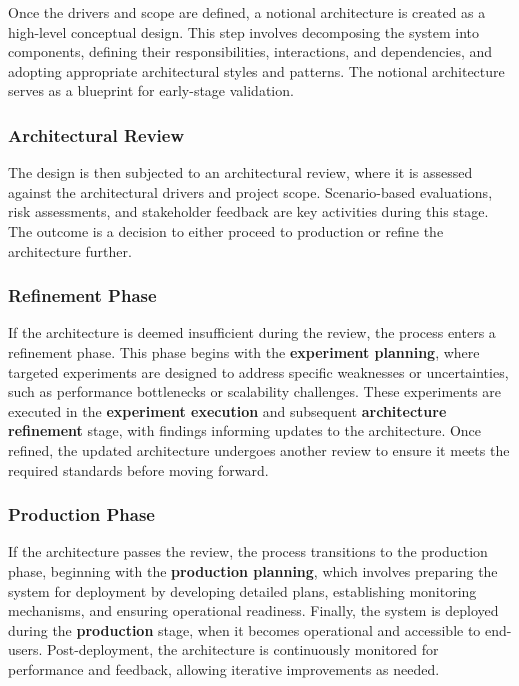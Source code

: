 Once the drivers and scope are defined, a notional architecture is created as a high-level conceptual design. This step involves decomposing the system into components, defining their responsibilities, interactions, and dependencies, and adopting appropriate architectural styles and patterns. The notional architecture serves as a blueprint for early-stage validation.

\subsubsection{Architectural Review}

The design is then subjected to an architectural review, where it is assessed against the architectural drivers and project scope. Scenario-based evaluations, risk assessments, and stakeholder feedback are key activities during this stage. The outcome is a decision to either proceed to production or refine the architecture further.

\subsubsection{Refinement Phase}

If the architecture is deemed insufficient during the review, the process enters a refinement phase. This phase begins with the \textbf{experiment planning}, where targeted experiments are designed to address specific weaknesses or uncertainties, such as performance bottlenecks or scalability challenges. These experiments are executed in the \textbf{experiment execution} and subsequent \textbf{architecture refinement} stage, with findings informing updates to the architecture. Once refined, the updated architecture undergoes another review to ensure it meets the required standards before moving forward.

\subsubsection{Production Phase}

If the architecture passes the review, the process transitions to the production phase, beginning with the \textbf{production planning}, which involves preparing the system for deployment by developing detailed plans, establishing monitoring mechanisms, and ensuring operational readiness. Finally, the system is deployed during the \textbf{production} stage, when it becomes operational and accessible to end-users. Post-deployment, the architecture is continuously monitored for performance and feedback, allowing iterative improvements as needed.

